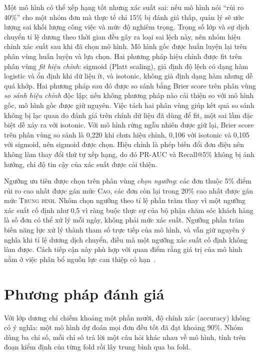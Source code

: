 \documentclass[12pt,a4paper]{report}
\begin{document}
Một mô hình có thể xếp hạng tốt nhưng xác suất sai: nếu mô hình nói ``rủi ro 40\%'' cho một nhóm đơn mà thực tế chỉ 15\% bị đánh giá thấp, quản lý sẽ ước lượng sai khối lượng công việc và mức độ nghiêm trọng. Trọng số lớp và sự dịch chuyển tỉ lệ dương theo thời gian đều gây ra loại sai lệch này, nên nhóm hiệu chỉnh xác suất sau khi đã chọn mô hình. Mô hình gốc được huấn luyện lại trên phân vùng huấn luyện và lựa chọn. Hai phương pháp hiệu chỉnh được fit trên phân vùng \emph{fit hiệu chỉnh}: sigmoid (Platt scaling), giả định độ lệch có dạng hàm logistic và ổn định khi dữ liệu ít, và isotonic, không giả định dạng hàm nhưng dễ quá khớp. Hai phương pháp sau đó được so sánh bằng Brier score trên phân vùng \emph{so sánh hiệu chỉnh} độc lập; nếu không phương pháp nào cải thiện so với mô hình gốc, mô hình gốc được giữ nguyên. Việc tách hai phân vùng giúp kết quả so sánh không bị lạc quan do đánh giá trên chính dữ liệu đã dùng để fit, một sai lầm đặc biệt dễ xảy ra với isotonic. Với mô hình rừng ngẫu nhiên được giữ lại, Brier score trên phân vùng so sánh là 0,220 khi chưa hiệu chỉnh, 0,106 với isotonic và 0,105 với sigmoid, nên sigmoid được chọn. Hiệu chỉnh là phép biến đổi đơn điệu nên không làm thay đổi thứ tự xếp hạng, do đó PR-AUC và Recall@5\% không bị ảnh hưởng, chỉ độ tin cậy của xác suất được cải thiện.

Ngưỡng ưu tiên được chọn trên phân vùng \emph{chọn ngưỡng}: các đơn thuộc 5\% điểm rủi ro cao nhất được gán mức \textsc{Cao}, các đơn còn lại trong 20\% cao nhất được gán mức \textsc{Trung bình}. Nhóm chọn ngưỡng theo tỉ lệ phần trăm thay vì một ngưỡng xác suất cố định như 0,5 vì ràng buộc thực sự của bộ phận chăm sóc khách hàng là số đơn có thể xử lý mỗi ngày, không phải mức xác suất. Ngưỡng phần trăm biến năng lực xử lý thành tham số trực tiếp của mô hình, và vẫn giữ nguyên ý nghĩa khi tỉ lệ dương dịch chuyển, điều mà một ngưỡng xác suất cố định không làm được. Cách tiếp cận này phù hợp với quan điểm rằng giá trị của mô hình nằm ở việc phân bổ nguồn lực can thiệp có hạn~\cite{gomezvargas2025}.

\section{Phương pháp đánh giá}\label{sec:eval}

Với lớp dương chỉ chiếm khoảng một phần mười, độ chính xác (accuracy) không có ý nghĩa: một mô hình dự đoán mọi đơn đều tốt đã đạt khoảng 90\%. Nhóm dùng ba chỉ số, mỗi chỉ số trả lời một câu hỏi khác nhau về mô hình, tính trên đoạn kiểm định của từng fold rồi lấy trung bình qua ba fold.
\end{document}
